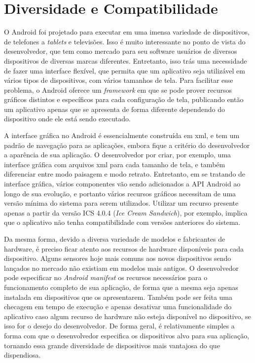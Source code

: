 \section{Diversidade e Compatibilidade}

O Android foi projetado para executar em uma imensa variedade de dispositivos, de telefones a \textit{tablets} e televisões. Isso é muito interessante no ponto de vista do desenvolvedor, que tem como mercado para seu software usuários de diversos dispositivos de diversas marcas diferentes. Entretanto, isso trás uma necessidade de fazer uma interface flexível, que permita que um aplicativo seja utilizável em vários tipos de dispositivos, com vários tamanhos de tela. Para facilitar esse problema, o Android oferece um \textit{framework} em que se pode prover recursos gráficos distintos e específicos para cada configuração de tela, publicando então um aplicativo apenas que se apresenta de forma diferente dependendo do dispositivo onde ele está sendo executado.  

A interface gráfica no Android é essencialmente construída em xml, e tem um padrão de navegação para as aplicações, embora fique a critério do desenvolvedor a aparência de sua aplicação. O desenvolvedor por criar, por exemplo, uma interface gráfica com arquivos xml para cada tamanho de tela, e também diferenciar entre modo paisagem e modo retrato. Entretanto, em se tratando de interface gráfica, vários componentes vão sendo adicionados a API Android ao longo de sua evolução, e portanto vários recursos gráficos necessitam de uma versão mínima do sistema para serem utilizados. Utilizar um recurso presente apenas a partir da versão ICS 4.0.4 (\textit{Ice Cream Sandwich}), por exemplo, implica que o aplicativo não tenha compatibilidade com versões anteriores do sistema.  

Da mesma forma, devido a diversa variedade de modelos e fabricantes de hardware, é preciso ficar atento aos recursos de hardware disponíveis para cada dispositivo. Alguns sensores hoje mais comuns aos novos dispositivos sendo lançados no mercado não existiam em modelos mais antigos. O desenvolvedor pode especificar no \textit{Android manifest} os recursos necessários para o funcionamento completo de sua aplicação, de forma que a mesma seja apenas instalada em dispositivos que os apresentarem. Também pode ser feita uma checagem em tempo de execução e apenas desativar uma funcionalidade do aplicativo caso algum recurso de hardware não esteja disponível no dispositivo, se isso for o desejo do desenvolvedor. De forma geral, é relativamente simples a forma com que o desenvolvedor especifica os dispositivos alvo para sua aplicação, tornando essa grande diversidade de dispositivos mais vantajosa do que dispendiosa. 

